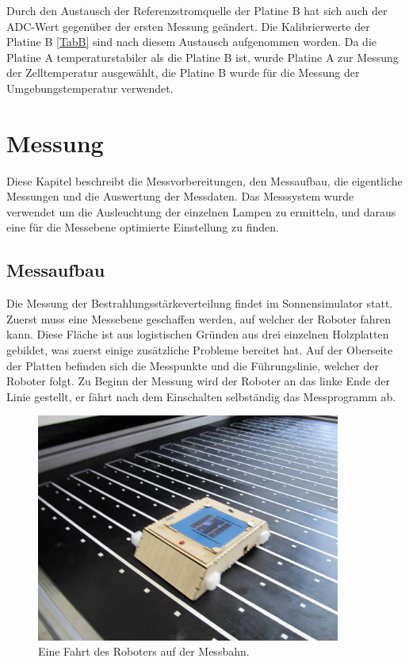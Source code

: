\documentclass[a4paper,bibtotoc,oneside]{scrbook}
\begin{document}
Durch den Austausch der Referenzstromquelle der Platine B hat sich auch der ADC-Wert gegenüber der ersten Messung geändert. Die Kalibrierwerte der Platine B \ref{TabB} sind nach diesem Austausch aufgenommen worden.
Da die Platine A temperaturstabiler als die Platine B ist, wurde Platine A zur Messung der Zelltemperatur ausgewählt, die Platine B wurde für die Messung der Umgebungstemperatur verwendet. 

\chapter{Messung}\thispagestyle{empty}

Diese Kapitel beschreibt die Messvorbereitungen, den Messaufbau, die eigentliche Messungen und die Auswertung der Messdaten. Das Messsystem wurde verwendet um die Ausleuchtung der einzelnen Lampen zu ermitteln, und daraus eine für die Messebene optimierte Einstellung zu finden.

\section{Messaufbau}\thispagestyle{empty}
Die Messung der Bestrahlungsstärkeverteilung findet im Sonnensimulator statt. Zuerst muss eine Messebene geschaffen werden, auf welcher der Roboter fahren kann. Diese Fläche ist aus logistischen Gründen aus drei einzelnen Holzplatten gebildet, was zuerst einige zusätzliche Probleme bereitet hat. Auf der Oberseite der Platten befinden sich die Messpunkte und die Führungslinie, welcher der Roboter folgt. Zu Beginn der Messung wird der Roboter an das linke Ende der Linie gestellt, er fährt nach dem Einschalten selbständig das Messprogramm ab.

\begin{figure}[htbp]
\centering
\includegraphics[width=100mm]{img/robofahrt.jpg}
\caption{Eine Fahrt des Roboters auf der Messbahn.}\label{robofahrt}
\end{figure}
\end{document}
